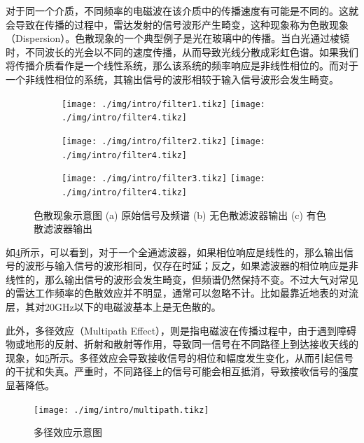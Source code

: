 对于同一个介质，不同频率的电磁波在该介质中的传播速度有可能是不同的。这就会导致在传播的过程中，雷达发射的信号波形产生畸变，这种现象称为色散现象（Dispersion）。色散现象的一个典型例子是光在玻璃中的传播。当白光通过棱镜时，不同波长的光会以不同的速度传播，从而导致光线分散成彩虹色谱。如果我们将传播介质看作是一个线性系统，那么该系统的频率响应是非线性相位的。而对于一个非线性相位的系统，其输出信号的波形相较于输入信号波形会发生畸变。
\begin{figure}[htb!]
    \centering
    \begin{subfigure}{.3\textwidth}
        \centering
        \texttt{[image: ./img/intro/filter1.tikz]}
        \texttt{[image: ./img/intro/filter4.tikz]}
        \caption{}
        \label{fig_chp1_filter_1}
    \end{subfigure}
    \begin{subfigure}{.3\textwidth}
        \centering
        \texttt{[image: ./img/intro/filter2.tikz]}
        \texttt{[image: ./img/intro/filter4.tikz]}
        \caption{}
        \label{fig_chp1_filter_2}
    \end{subfigure}
    \begin{subfigure}{.3\textwidth}
        \centering
        \texttt{[image: ./img/intro/filter3.tikz]}
        \texttt{[image: ./img/intro/filter4.tikz]}
        \caption{}
        \label{fig_chp1_filter_3}
    \end{subfigure}
    \caption{色散现象示意图 (a) 原始信号及频谱 (b) 无色散滤波器输出 (c) 有色散滤波器输出}
    \label{fig_chp1_filter}
\end{figure}

如\cref{fig_chp1_filter}所示，可以看到，对于一个全通滤波器，如果相位响应是线性的，那么输出信号的波形与输入信号的波形相同，仅存在时延；反之，如果滤波器的相位响应是非线性的，那么输出信号的波形会发生畸变，但频谱仍然保持不变。不过大气对常见的雷达工作频率的色散效应并不明显，通常可以忽略不计。比如最靠近地表的对流层，其对20GHz以下的电磁波基本上是无色散的。

此外，多径效应（Multipath Effect），则是指电磁波在传播过程中，由于遇到障碍物或地形的反射、折射和散射等作用，导致同一信号在不同路径上到达接收天线的现象，如\cref{fig_chp1_multipath}所示。多径效应会导致接收信号的相位和幅度发生变化，从而引起信号的干扰和失真。严重时，不同路径上的信号可能会相互抵消，导致接收信号的强度显著降低。

\begin{figure}[htb!]
    \centering
    \texttt{[image: ./img/intro/multipath.tikz]}
    \caption{多径效应示意图}
    \label{fig_chp1_multipath}
\end{figure}

